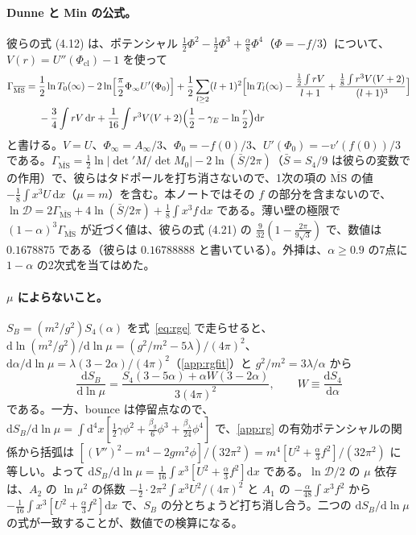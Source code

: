 \documentclass[a4paper,10pt]{ltjsarticle}
\newcommand{\dd}{\mathrm{d}}
\begin{document}
\paragraph{Dunne と Min の公式。}彼らの式 (4.12) は、ポテンシャル $\frac12\Phi^2-\frac12\Phi^3+\frac\alpha8\Phi^4$（$\Phi=-f/3$）について、$V(r)=U''(\Phi_{\mathrm{cl}})-1$ を使って
\begin{equation*}
\begin{aligned}
\Gamma_{\overline{\mathrm{MS}}}={}&\frac12\ln T_0(\infty)-2\ln\Bigl[\frac\pi2\Phi_\infty U'(\Phi_0)\Bigr]
+\frac12\sum_{l\ge2}(l+1)^2\Bigl[\ln T_l(\infty)-\frac{\frac12\int rV}{l+1}+\frac{\frac18\int r^3V(V+2)}{(l+1)^3}\Bigr]\\
&-\frac34\int rV\,\dd r+\frac1{16}\int r^3V(V+2)\Bigl(\frac12-\gamma_E-\ln\frac r2\Bigr)\dd r
\end{aligned}
\end{equation*}
と書ける。$V=U$、$\Phi_\infty=A_\infty/3$、$\Phi_0=-f(0)/3$、$U'(\Phi_0)=-v'(f(0))/3$ である。$\Gamma_{\overline{\mathrm{MS}}}=\frac12\ln|\det'M/\det M_0|-2\ln(\bar S/2\pi)$（$\bar S=S_4/9$ は彼らの変数での作用）で、彼らはタドポールを打ち消さないので、1次の項の $\overline{\mathrm{MS}}$ の値 $-\frac18\int x^3U\,\dd x$（$\mu=m$）を含む。本ノートではその $f$ の部分を含まないので、$\ln\mathcal D=2\Gamma_{\overline{\mathrm{MS}}}+4\ln(\bar S/2\pi)+\frac18\int x^3f\,\dd x$ である。薄い壁の極限で $(1-\alpha)^3\Gamma_{\overline{\mathrm{MS}}}$ が近づく値は、彼らの式 (4.21) の $\frac{9}{32}(1-\frac{2\pi}{9\sqrt3})$ で、数値は $0.1678875$ である（彼らは $0.16788888$ と書いている）。外挿は、$\alpha\ge0.9$ の7点に $1-\alpha$ の2次式を当てはめた。

\paragraph{$\mu$ によらないこと。}$S_B=(m^2/g^2)S_4(\alpha)$ を式~\eqref{eq:rge} で走らせると、$\dd\ln(m^2/g^2)/\dd\ln\mu=(g^2/m^2-5\lambda)/(4\pi)^2$、$\dd\alpha/\dd\ln\mu=\lambda(3-2\alpha)/(4\pi)^2$（\ref{app:rgfit}）と $g^2/m^2=3\lambda/\alpha$ から
\begin{equation*}
\frac{\dd S_B}{\dd\ln\mu}=\frac{S_4(3-5\alpha)+\alpha W(3-2\alpha)}{3(4\pi)^2},\qquad W\equiv\frac{\dd S_4}{\dd\alpha}
\end{equation*}
である。一方、bounce は停留点なので、$\dd S_B/\dd\ln\mu=\int\dd^4x[\frac12\gamma\phi^2+\frac{\beta_g}6\phi^3+\frac{\beta_\lambda}{24}\phi^4]$ で、\ref{app:rg} の有効ポテンシャルの関係から括弧は $[(V'')^2-m^4-2gm^2\phi]/(32\pi^2)=m^4[U^2+\frac\alpha3f^2]/(32\pi^2)$ に等しい。よって $\dd S_B/\dd\ln\mu=\frac1{16}\int x^3[U^2+\frac\alpha3f^2]\dd x$ である。$\ln\mathcal D/2$ の $\mu$ 依存は、$A_2$ の $\ln\mu^2$ の係数 $-\frac12\cdot2\pi^2\int x^3U^2/(4\pi)^2$ と $A_1$ の $-\frac{\alpha}{48}\int x^3f^2$ から $-\frac1{16}\int x^3[U^2+\frac\alpha3f^2]\dd x$ で、$S_B$ の分とちょうど打ち消し合う。二つの $\dd S_B/\dd\ln\mu$ の式が一致することが、数値での検算になる。
\end{document}
